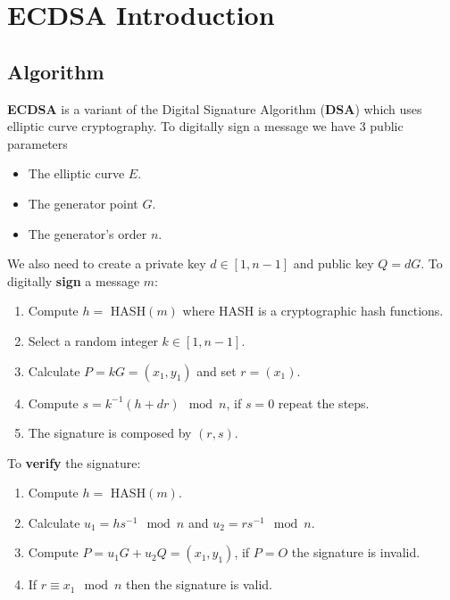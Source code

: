 \documentclass[a4paper,12pt]{report}
\begin{document}
\section{ECDSA Introduction}

\subsection{Algorithm}

\textbf{ECDSA} is a variant of the Digital Signature Algorithm (\textbf{DSA}) which uses elliptic curve cryptography.
To digitally sign a message we have 3 public parameters

\begin{itemize}
    \item The elliptic curve \textbf{$E$}.
    \item The generator point \textbf{$G$}.
    \item The generator's order \textbf{$n$}.
\end{itemize}

We also need to create a private key $d \in [1, n-1]$ and public key $Q = dG$. To digitally \textbf{sign} a message $m$:

\begin{enumerate}
    \item Compute $h = $ HASH$(m)$ where HASH is a cryptographic hash functions.
    \item Select a random integer $k \in [1, n-1]$.
    \item Calculate $P = kG = (x_1, y_1)$ and set $r = (x_1)$.
    \item Compute $s = k^{-1}(h + dr) \mod n$, if $s = 0$ repeat the steps.
    \item The signature is composed by $(r, s)$.
\end{enumerate}

\vspace*{10px}

To \textbf{verify} the signature:

\begin{enumerate}
    \item Compute $h = $ HASH$(m)$.
    \item Calculate $u_1 = hs^{-1} \mod n$ and $u_2 = rs^{-1} \mod n$.
    \item Compute $P = u_1G + u_2Q = (x_1, y_1)$, if $P = O$ the signature is invalid.
    \item If $r \equiv x_1 \mod n$ then the signature is valid.
\end{enumerate}
\end{document}
